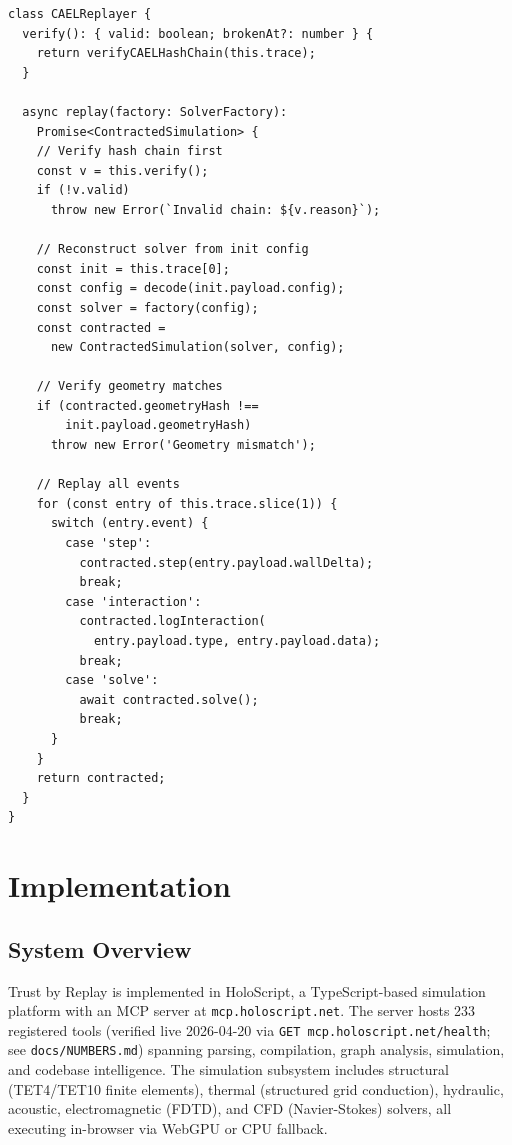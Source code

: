 \documentclass[letterpaper,twocolumn,10pt]{article}
\newcommand{\holoscript}{HoloScript}
\begin{document}
\begin{lstlisting}[caption={CAELReplayer verification (simplified).},
  label=lst:replayer]
class CAELReplayer {
  verify(): { valid: boolean; brokenAt?: number } {
    return verifyCAELHashChain(this.trace);
  }

  async replay(factory: SolverFactory):
    Promise<ContractedSimulation> {
    // Verify hash chain first
    const v = this.verify();
    if (!v.valid)
      throw new Error(`Invalid chain: ${v.reason}`);

    // Reconstruct solver from init config
    const init = this.trace[0];
    const config = decode(init.payload.config);
    const solver = factory(config);
    const contracted =
      new ContractedSimulation(solver, config);

    // Verify geometry matches
    if (contracted.geometryHash !==
        init.payload.geometryHash)
      throw new Error('Geometry mismatch');

    // Replay all events
    for (const entry of this.trace.slice(1)) {
      switch (entry.event) {
        case 'step':
          contracted.step(entry.payload.wallDelta);
          break;
        case 'interaction':
          contracted.logInteraction(
            entry.payload.type, entry.payload.data);
          break;
        case 'solve':
          await contracted.solve();
          break;
      }
    }
    return contracted;
  }
}
\end{lstlisting}


\section{Implementation}
\label{sec:impl}

\subsection{System Overview}

Trust by Replay is implemented in \holoscript{}, a TypeScript-based
simulation platform with an MCP server at \texttt{mcp.holoscript.net}. The
server hosts 233 registered tools (verified live 2026-04-20 via \texttt{GET mcp.holoscript.net/health}; see \texttt{docs/NUMBERS.md}) spanning parsing, compilation, graph
analysis, simulation, and codebase intelligence. The simulation subsystem
includes structural (TET4/TET10 finite elements), thermal (structured grid
conduction), hydraulic, acoustic, electromagnetic (FDTD), and CFD
(Navier-Stokes) solvers, all executing in-browser via WebGPU or CPU fallback.
\end{document}
